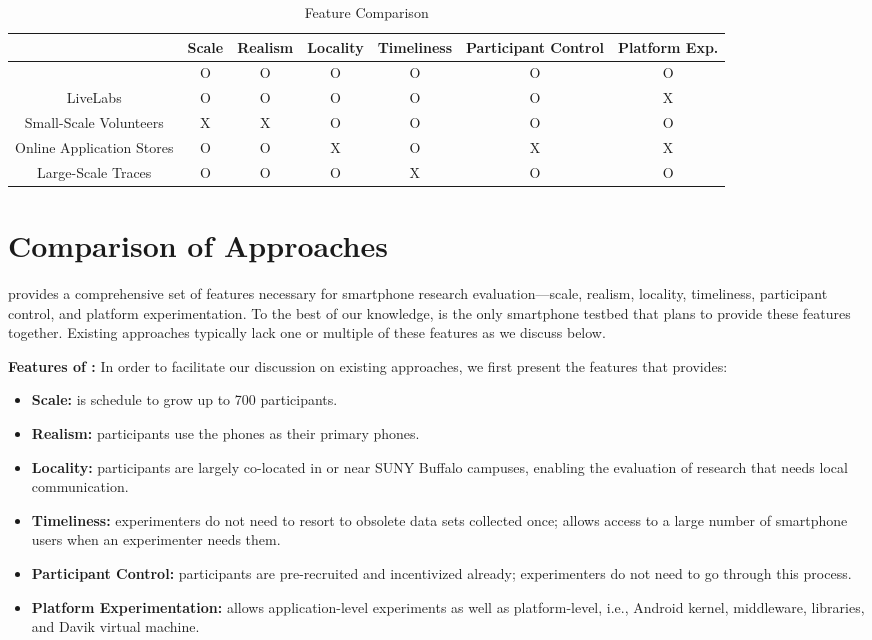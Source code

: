 \begin{table*}[t]
\centering
\begin{tabular}{|c|c|c|c|c|c|c|}
\hline
& Scale & Realism & Locality & Timeliness & Participant Control & Platform
Exp.\\
\hline
\PhoneLab{} & O & O & O & O & O & O\\
LiveLabs{} & O & O & O & O & O & X\\
Small-Scale Volunteers & X & X & O & O & O & O\\
Online Application Stores & O & O & X & O & X & X\\
Large-Scale Traces & O & O & O & X & O & O\\
\hline
\end{tabular}
\caption{Feature Comparison}
\label{tab:comparison}
\end{table*}

\section{Comparison of Approaches}
\label{sec:comparison}

\PhoneLab{} provides a comprehensive set of features necessary for smartphone
research evaluation---scale, realism, locality, timeliness, participant control,
and platform experimentation. To the best of our knowledge, \PhoneLab{} is the
only smartphone testbed that plans to provide these features together. Existing
approaches typically lack one or multiple of these features as we discuss below.

{\bf Features of \PhoneLab{}:} In order to facilitate our discussion on existing
approaches, we first present the features that \PhoneLab{} provides:

\begin{itemize}[nosep]
\item {\bf Scale:} \PhoneLab{} is schedule to grow up to 700 participants.
\item {\bf Realism:} \PhoneLab{} participants use the phones as their primary
phones.
\item {\bf Locality:} \PhoneLab{} participants are largely co-located in or near
SUNY Buffalo campuses, enabling the evaluation of research that needs local
communication.
\item {\bf Timeliness:} \PhoneLab{} experimenters do not need to resort to
obsolete data sets collected once; \PhoneLab{} allows access to a large number
of smartphone users when an experimenter needs them.
\item {\bf Participant Control:} \PhoneLab{} participants are pre-recruited and
incentivized already; experimenters do not need to go through this process.
\item {\bf Platform Experimentation:} \PhoneLab{} allows application-level
experiments as well as platform-level, i.e., Android kernel, middleware,
libraries, and Davik virtual machine.
\end{itemize}

